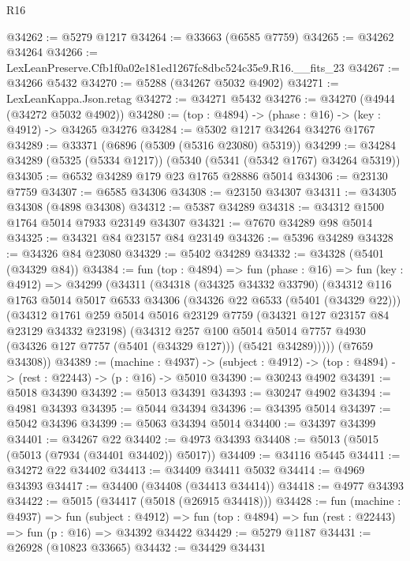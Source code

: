 \begin{lexlean}{R16}
\begin{coremodule}
@34262 := @5279 @1217
@34264 := @33663 (@6585 @7759)
@34265 := @34262 @34264
@34266 := LexLeanPreserve.Cfb1f0a02e181ed1267fc8dbc524c35e9.R16.__fits_23
@34267 := @34266 @5432
@34270 := @5288 (@34267 @5032 @4902)
@34271 := LexLeanKappa.Json.retag
@34272 := @34271 @5432
@34276 := @34270 (@4944 (@34272 @5032 @4902))
@34280 := (top : @4894) -> (phase : @16) -> (key : @4912) -> @34265 @34276
@34284 := @5302 @1217 @34264 @34276 @1767
@34289 := @33371 (@6896 (@5309 (@5316 @23080) @5319))
@34299 := @34284 @34289 (@5325 (@5334 @1217)) (@5340 (@5341 (@5342 @1767) @34264 @5319))
@34305 := @6532 @34289 @179 @23 @1765 @28886 @5014
@34306 := @23130 @7759
@34307 := @6585 @34306
@34308 := @23150 @34307
@34311 := @34305 @34308 (@4898 @34308)
@34312 := @5387 @34289
@34318 := @34312 @1500 @1764 @5014 @7933 @23149 @34307
@34321 := @7670 @34289 @98 @5014
@34325 := @34321 @84 @23157 @84 @23149
@34326 := @5396 @34289
@34328 := @34326 @84 @23080
@34329 := @5402 @34289
@34332 := @34328 (@5401 (@34329 @84))
@34384 := fun (top : @4894) =>
  fun (phase : @16) =>
  fun (key : @4912) =>
  @34299
    (@34311
      (@34318
        (@34325 @34332 @33790)
        (@34312
          @116
          @1763
          @5014
          @5017
          @6533
          @34306
          (@34326 @22 @6533 (@5401 (@34329 @22)))
          (@34312
            @1761
            @259
            @5014
            @5016
            @23129
            @7759
            (@34321 @127 @23157 @84 @23129 @34332 @23198)
            (@34312
              @257
              @100
              @5014
              @5014
              @7757
              @4930
              (@34326 @127 @7757 (@5401 (@34329 @127)))
              (@5421 @34289)))))
      (@7659 @34308))
@34389 := (machine : @4937) ->
  (subject : @4912) -> (top : @4894) -> (rest : @22443) -> (p : @16) -> @5010
@34390 := @30243 @4902
@34391 := @5018 @34390
@34392 := @5013 @34391
@34393 := @30247 @4902
@34394 := @4981 @34393
@34395 := @5044 @34394
@34396 := @34395 @5014
@34397 := @5042 @34396
@34399 := @5063 @34394 @5014
@34400 := @34397 @34399
@34401 := @34267 @22
@34402 := @4973 @34393
@34408 := @5013 (@5015 (@5013 (@7934 (@34401 @34402)) @5017))
@34409 := @34116 @5445
@34411 := @34272 @22 @34402
@34413 := @34409 @34411 @5032
@34414 := @4969 @34393
@34417 := @34400 (@34408 (@34413 @34414))
@34418 := @4977 @34393
@34422 := @5015 (@34417 (@5018 (@26915 @34418)))
@34428 := fun (machine : @4937) =>
  fun (subject : @4912) =>
  fun (top : @4894) => fun (rest : @22443) => fun (p : @16) => @34392 @34422
@34429 := @5279 @1187
@34431 := @26928 (@10823 @33665)
@34432 := @34429 @34431

\end{coremodule}
\end{lexlean}
